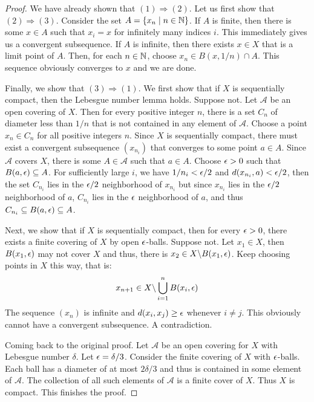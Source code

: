 \begin{proof}
    We have already shown that $(1)\Longrightarrow(2)$. Let us first show that $(2)\Longrightarrow(3)$. Consider the set $A = \{x_n\mid n\in\mathbb{N}\}$. If $A$ is finite, then there is some $x\in A$ such that $x_i = x$ for infinitely many indices $i$. This immediately gives us a convergent subsequence. If $A$ is infinite, then there exists $x\in X$ that is a limit point of $A$. Then, for each $n\in\mathbb{N}$, choose $x_n\in B(x, 1/n)\cap A$. This sequence obviously converges to $x$ and we are done.

    Finally, we show that $(3)\Longrightarrow(1)$. We first show that if $X$ is sequentially compact, then the Lebesgue number lemma holds. Suppose not. Let $\mathscr{A}$ be an open covering of $X$. Then for every positive integer $n$, there is a set $C_n$ of diameter less than $1/n$ that is not contained in any element of $\mathscr{A}$. Choose a point $x_n\in C_n$ for all positive integers $n$. Since $X$ is sequentially compact, there must exist a convergent subsequence $(x_{n_i})$ that converges to some point $a\in A$. Since $\mathscr{A}$ covers $X$, there is some $A\in\mathscr{A}$ such that $a\in A$. Choose $\epsilon > 0$ such that $B(a, \epsilon)\subseteq A$. For sufficiently large $i$, we have $1/n_i < \epsilon/2$ and $d(x_{n_i}, a) < \epsilon/2$, then the set $C_{n_i}$ lies in the $\epsilon/2$ neighborhood of $x_{n_i}$ but since $x_{n_i}$ lies in the $\epsilon/2$ neighborhood of $a$, $C_{n_i}$ lies in the $\epsilon$ neighborhood of $a$, and thus $C_{n_i}\subseteq B(a,\epsilon)\subseteq A$. 

    Next, we show that if $X$ is sequentially compact, then for every $\epsilon > 0$, there exists a finite covering of $X$ by open $\epsilon$-balls. Suppose not. Let $x_1\in X$, then $B(x_1,\epsilon)$ may not cover $X$ and thus, there is $x_2\in X\backslash B(x_1,\epsilon)$. Keep choosing points in $X$ this way, that is:
    \begin{equation*}
        x_{n + 1}\in X\backslash\bigcup_{i=1}^n B(x_i, \epsilon)
    \end{equation*}
    The sequence $(x_n)$ is infinite and $d(x_i, x_j)\ge\epsilon$ whenever $i\ne j$. This obviously cannot have a convergent subsequence. A contradiction.

    Coming back to the original proof. Let $\mathscr{A}$ be an open covering for $X$ with Lebesgue number $\delta$. Let $\epsilon = \delta/3$. Consider the finite covering of $X$ with $\epsilon$-balls. Each ball has a diameter of at most $2\delta/3$ and thus is contained in some element of $\mathscr{A}$. The collection of all such elements of $\mathscr{A}$ is a finite cover of $X$. Thus $X$ is compact. This finishes the proof.
\end{proof}

